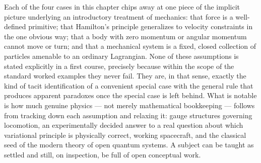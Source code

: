 Each of the four cases in this chapter chips away at one piece of
the implicit picture underlying an introductory treatment of
mechanics: that force is a well-defined primitive; that Hamilton's
principle generalizes to velocity constraints in the one obvious
way; that a body with zero momentum or angular momentum cannot move
or turn; and that a mechanical system is a fixed, closed collection
of particles amenable to an ordinary Lagrangian. None of these
assumptions is stated explicitly in a first course, precisely
because within the scope of the standard worked examples they never
fail. They are, in that sense, exactly the kind of tacit
identification of a convenient special case with the general rule
that produces apparent paradoxes once the special case is left
behind. What is notable is how much genuine physics --- not merely
mathematical bookkeeping --- follows from tracking down each
assumption and relaxing it: gauge structures governing locomotion,
an experimentally decided answer to a real question about which
variational principle is physically correct, working spacecraft, and
the classical seed of the modern theory of open quantum systems. A
subject can be taught as settled and still, on inspection, be full of
open conceptual work.

